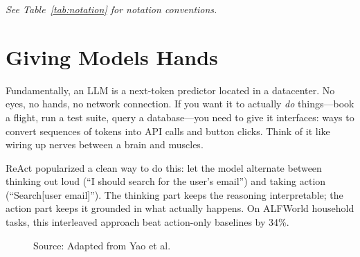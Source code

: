 \documentclass[12pt,a4paper]{report}
\theoremstyle{definition}
\newcommand{\source}[1]{\vspace{-0.5\baselineskip}\caption*{\small Source: #1}}
\begin{document}
\vspace{0.3cm}

\noindent\textit{See Table~\ref{tab:notation} for notation conventions.}

\section{Giving Models Hands}
Fundamentally, an LLM is a next-token predictor located in a datacenter. No eyes, no hands, no network connection. If you want it to actually \textit{do} things---book a flight, run a test suite, query a database---you need to give it interfaces: ways to convert sequences of tokens into API calls and button clicks.
 Think of it like wiring up nerves between a brain and muscles.

ReAct \cite{yao2023react} popularized a clean way to do this: let the model alternate between thinking out loud (``I should search for the user's email'') and taking action (``Search[user email]''). The thinking part keeps the reasoning interpretable; the action part keeps it grounded in what actually happens. On ALFWorld household tasks, this interleaved approach beat action-only baselines by 34\%.

\begin{figure}[htbp]
\centering
{}
\caption{How agentic workflows connect LLM-based logic, tool integration, environment feedback, and memory.
 The agent sharpens its actions step by step based on what it observes.}
\label{fig:agentic_workflow}
\source{Adapted from Yao et al.~\cite{yao2023react}}
\end{figure}
\end{document}
